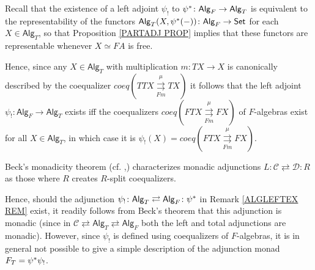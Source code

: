 \documentclass[a4paper,10pt
,draft
]{article}%
\renewcommand{\1}{\eta}%
\newcommand{\Alg}{\mathsf{Alg}}
\begin{document}
\begin{remark}\label{ALGLEFTEX REM}
Recall that the existence of a left adjoint $\psi_!$ to 
$\psi^{\**} \colon \Alg_F \to \Alg_T$
is equivalent to the representability of the functors 
$\Alg_T(X,\psi^{\**}(-))\colon \Alg_{F} \to \mathsf{Set}$
for each $X \in \Alg_T$,
so that Proposition \ref{PARTADJ PROP} implies that these functors are representable whenever $X \simeq FA$ is free.

Hence, since any $X \in \Alg_T$
with multiplication $m \colon TX \to X$
is canonically described by the coequalizer %
$coeq \left( T T X 
\overset{\mu}{\underset{Fm}{\rightrightarrows}}
T X\right)$
it follows that the left adjoint 
$\psi_! \colon \Alg_F \to \Alg_T$
exists iff the coequalizers 
$coeq \left( F T X 
\overset{\mu}{\underset{Fm}{\rightrightarrows}}
F X\right)
$
of $F$-algebras exist for all $X \in \Alg_T$, in which case it is
$\psi_!(X)=coeq \left( F T X 
\overset{\mu}{\underset{Fm}{\rightrightarrows}}
F X\right)$.
\end{remark}




\begin{remark}\label{ADJSRMON REM}
Beck's monadicity theorem (cf. \cite[VI.7 Thm. 1]{McL},\cite[Thm. 5.5.1]{Ri17})
characterizes monadic adjunctions $L\colon \mathcal{C} \rightleftarrows \mathcal{D}\colon R$
as those where $R$ creates $R$-split coequalizers. 

Hence, should the adjunction 
$\psi_! \colon \Alg_T \rightleftarrows \Alg_F \colon \psi^{\**}$
in Remark \ref{ALGLEFTEX REM} exist,
it readily follows from Beck's theorem that this adjunction is monadic
(since in 
$\mathcal{C} \rightleftarrows
\mathsf{Alg}_T \rightleftarrows
\Alg_F$
both the left and total adjunctions are monadic).
However, since $\psi_!$ is defined using coequalizers of $F$-algebras,
it is in general not possible to give a simple description of the adjunction monad
$F_T = \psi^{\**} \psi_!$.
%
\end{remark}
\end{document}
